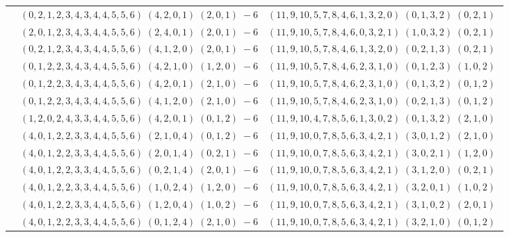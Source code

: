 \documentclass[11pt]{article}
\begin{document}
\begin{longtable}[l]{|c|c|c|}
 \cline{2-3} 
 & $(0 ,2 ,1 ,2 ,3 ,4 ,3 ,4 ,4 ,5 ,5 ,6) \;(4 ,2 ,0 ,1) \;(2 ,0 ,1) \;-6$ & $(11 ,9 ,10 ,5 ,7 ,8 ,4 ,6 ,1 ,3 ,2 ,0) \;(0 ,1 ,3 ,2) \;(0 ,2 ,1) \;$\\ 
 \cline{2-3} 
 & $(2 ,0 ,1 ,2 ,3 ,4 ,3 ,4 ,4 ,5 ,5 ,6) \;(2 ,4 ,0 ,1) \;(2 ,0 ,1) \;-6$ & $(11 ,9 ,10 ,5 ,7 ,8 ,4 ,6 ,0 ,3 ,2 ,1) \;(1 ,0 ,3 ,2) \;(0 ,2 ,1) \;$\\ 
 \cline{2-3} 
 & $(0 ,2 ,1 ,2 ,3 ,4 ,3 ,4 ,4 ,5 ,5 ,6) \;(4 ,1 ,2 ,0) \;(2 ,0 ,1) \;-6$ & $(11 ,9 ,10 ,5 ,7 ,8 ,4 ,6 ,1 ,3 ,2 ,0) \;(0 ,2 ,1 ,3) \;(0 ,2 ,1) \;$\\ 
 \cline{2-3} 
 & $(0 ,1 ,2 ,2 ,3 ,4 ,3 ,4 ,4 ,5 ,5 ,6) \;(4 ,2 ,1 ,0) \;(1 ,2 ,0) \;-6$ & $(11 ,9 ,10 ,5 ,7 ,8 ,4 ,6 ,2 ,3 ,1 ,0) \;(0 ,1 ,2 ,3) \;(1 ,0 ,2) \;$\\ 
 \cline{2-3} 
 & $(0 ,1 ,2 ,2 ,3 ,4 ,3 ,4 ,4 ,5 ,5 ,6) \;(4 ,2 ,0 ,1) \;(2 ,1 ,0) \;-6$ & $(11 ,9 ,10 ,5 ,7 ,8 ,4 ,6 ,2 ,3 ,1 ,0) \;(0 ,1 ,3 ,2) \;(0 ,1 ,2) \;$\\ 
 \cline{2-3} 
 & $(0 ,1 ,2 ,2 ,3 ,4 ,3 ,4 ,4 ,5 ,5 ,6) \;(4 ,1 ,2 ,0) \;(2 ,1 ,0) \;-6$ & $(11 ,9 ,10 ,5 ,7 ,8 ,4 ,6 ,2 ,3 ,1 ,0) \;(0 ,2 ,1 ,3) \;(0 ,1 ,2) \;$\\ 
 \cline{2-3} 
 & $(1 ,2 ,0 ,2 ,4 ,3 ,3 ,4 ,4 ,5 ,5 ,6) \;(4 ,2 ,0 ,1) \;(0 ,1 ,2) \;-6$ & $(11 ,9 ,10 ,4 ,7 ,8 ,5 ,6 ,1 ,3 ,0 ,2) \;(0 ,1 ,3 ,2) \;(2 ,1 ,0) \;$\\ 
 \cline{2-3} 
 & $(4 ,0 ,1 ,2 ,2 ,3 ,3 ,4 ,4 ,5 ,5 ,6) \;(2 ,1 ,0 ,4) \;(0 ,1 ,2) \;-6$ & $(11 ,9 ,10 ,0 ,7 ,8 ,5 ,6 ,3 ,4 ,2 ,1) \;(3 ,0 ,1 ,2) \;(2 ,1 ,0) \;$\\ 
 \cline{2-3} 
 & $(4 ,0 ,1 ,2 ,2 ,3 ,3 ,4 ,4 ,5 ,5 ,6) \;(2 ,0 ,1 ,4) \;(0 ,2 ,1) \;-6$ & $(11 ,9 ,10 ,0 ,7 ,8 ,5 ,6 ,3 ,4 ,2 ,1) \;(3 ,0 ,2 ,1) \;(1 ,2 ,0) \;$\\ 
 \cline{2-3} 
 & $(4 ,0 ,1 ,2 ,2 ,3 ,3 ,4 ,4 ,5 ,5 ,6) \;(0 ,2 ,1 ,4) \;(2 ,0 ,1) \;-6$ & $(11 ,9 ,10 ,0 ,7 ,8 ,5 ,6 ,3 ,4 ,2 ,1) \;(3 ,1 ,2 ,0) \;(0 ,2 ,1) \;$\\ 
 \cline{2-3} 
 & $(4 ,0 ,1 ,2 ,2 ,3 ,3 ,4 ,4 ,5 ,5 ,6) \;(1 ,0 ,2 ,4) \;(1 ,2 ,0) \;-6$ & $(11 ,9 ,10 ,0 ,7 ,8 ,5 ,6 ,3 ,4 ,2 ,1) \;(3 ,2 ,0 ,1) \;(1 ,0 ,2) \;$\\ 
 \cline{2-3} 
 & $(4 ,0 ,1 ,2 ,2 ,3 ,3 ,4 ,4 ,5 ,5 ,6) \;(1 ,2 ,0 ,4) \;(1 ,0 ,2) \;-6$ & $(11 ,9 ,10 ,0 ,7 ,8 ,5 ,6 ,3 ,4 ,2 ,1) \;(3 ,1 ,0 ,2) \;(2 ,0 ,1) \;$\\ 
 \cline{2-3} 
 & $(4 ,0 ,1 ,2 ,2 ,3 ,3 ,4 ,4 ,5 ,5 ,6) \;(0 ,1 ,2 ,4) \;(2 ,1 ,0) \;-6$ & $(11 ,9 ,10 ,0 ,7 ,8 ,5 ,6 ,3 ,4 ,2 ,1) \;(3 ,2 ,1 ,0) \;(0 ,1 ,2) \;$\\ 

\end{longtable}
\end{document}

